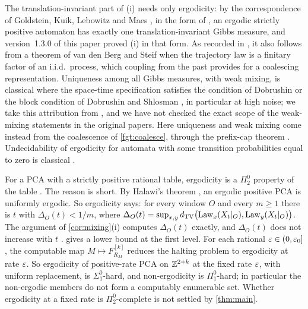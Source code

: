 The translation-invariant part of (i) needs only ergodicity: by the correspondence of Goldstein, Kuik, Lebowitz and Maes \cite{GKLM89}, in the form of \cite[Corollary~10.4 and Theorem~10.10(i)]{DM26}, an ergodic strictly positive automaton has exactly one translation-invariant Gibbs measure, and version~1.3.0 of this paper proved (i) in that form. As recorded in \cite[Remark~13.9]{DM26}, it also follows from a theorem of van den Berg and Steif \cite[Theorem~2.1]{vdBS99} when the trajectory law is a finitary factor of an i.i.d.\ process, which coupling from the past provides for a coalescing representation. Uniqueness among all Gibbs measures, with weak mixing, is classical where the space-time specification satisfies the condition of Dobrushin \cite{Dob68} or the block condition of Dobrushin and Shlosman \cite{DS85}, in particular at high noise; we take this attribution from \cite[Remark~13.9]{DM26}, and we have not checked the exact scope of the weak-mixing statements in the original papers. Here uniqueness and weak mixing come instead from the coalescence of \cref{fgt:coalesce}, through the prefix-cap theorem \cite[Theorem~13.3]{DM26}. Undecidability of ergodicity for automata with some transition probabilities equal to zero is classical \cite{Kurdyumov78,Toom00,BMM13}.

\begin{remark}\label{pf:arith}
For a PCA with a strictly positive rational table, ergodicity is a $\Pi^0_2$ property of the table \cite[Remark~10.9]{DM26}. The reason is short. By Halawi's theorem \cite{Halawi22}, an ergodic positive PCA is uniformly ergodic. So ergodicity says: for every window $O$ and every $m\ge1$ there is $t$ with $\Delta_O(t)<1/m$, where $\Delta_O(t)=\sup_{x,y}d_{\mathrm{TV}}\bigl(\mathrm{Law}_x(X_t|_O),\mathrm{Law}_y(X_t|_O)\bigr)$. The argument of \cref{cor:mixing}(i) computes $\Delta_O(t)$ exactly, and $\Delta_O(t)$ does not increase with $t$ \cite[Remark~10.9]{DM26}.  gives a lower bound at the first level. For each rational $\varepsilon\in(0,\varepsilon_0]$, the computable map $M\mapsto F^{[k]}_{R_M}$ reduces the halting problem to ergodicity at rate $\varepsilon$. So ergodicity of positive-rate PCA on $\mathbb{Z}^{2+k}$ at the fixed rate $\varepsilon$, with uniform replacement, is $\Sigma^0_1$-hard, and non-ergodicity is $\Pi^0_1$-hard; in particular the non-ergodic members do not form a computably enumerable set. Whether ergodicity at a fixed rate is $\Pi^0_2$-complete is not settled by \cref{thm:main}.
\end{remark}

